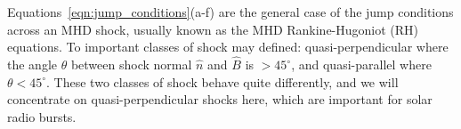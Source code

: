 Equations~\ref{eqn:jump_conditions}(a-f) are the general case of the jump conditions across an MHD shock, usually known as the MHD Rankine-Hugoniot (RH) equations. To important classes of shock may defined: quasi-perpendicular where the angle $\theta$ between shock normal $\hat{n}$ and $\hat{B}$ is $>45^{\circ}$, and quasi-parallel where $\theta<45^{\circ}$. These two classes of shock behave quite differently, and we will concentrate on quasi-perpendicular shocks here, which are important for solar radio bursts.

